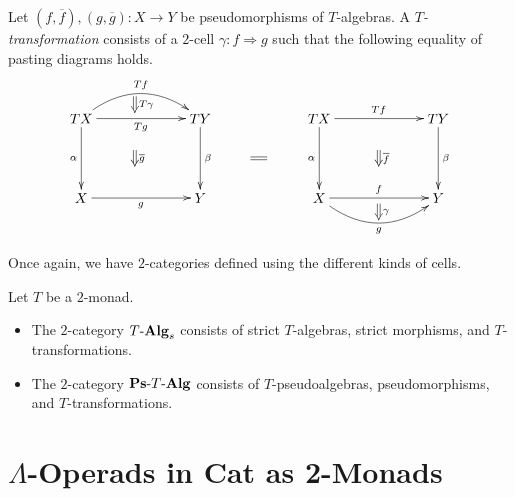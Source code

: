 \begin{Defi}
Let $(f, \overline{f}), (g, \overline{g}) \colon X \rightarrow Y$ be pseudomorphisms of $T$-algebras. A \textit{$T$-transformation} consists of a $2$-cell $\gamma \colon f \Rightarrow g$ such that the following equality of pasting diagrams holds.
    \[
        \xy
            (0,0)*+{TX}="00";
            (30,0)*+{TY}="10";
            (0,-20)*+{X}="01";
            (30,-20)*+{Y}="11";
            {\ar@/^1.5pc/^{Tf} "00" ; "10"};
            {\ar_{Tg} "00" ; "10"};
            {\ar^{\beta} "10" ; "11"};
            {\ar_{\alpha} "00" ; "01"};
            {\ar_{g} "01" ; "11"};
            {\ar@{=>}^{T \gamma} (13.5,5.5) ; (13.5,1.5)};
            {\ar@{=>}^{\overline{g}} (13.5,-8) ; (13.5,-12)};
            (60,0)*+{TX}="x00";
            (90,0)*+{TY}="x10";
            (60,-20)*+{X}="x01";
            (90,-20)*+{Y}="x11";
            {\ar^{Tf} "x00" ; "x10"};
            {\ar^{\beta} "x10" ; "x11"};
            {\ar_{\alpha} "x00" ; "x01"};
            {\ar^{f} "x01" ; "x11"};
            {\ar@/_1.5pc/_{g} "x01" ; "x11"};
            {\ar@{=>}^{\gamma} (75,-21.5) ; (75,-25.5)};
            {\ar@{=>}^{\overline{f}} (75,-8) ; (75,-12)};
            {\ar@{=} (42.75,-10) ; (46.75,-10)};
        \endxy
    \]

\end{Defi}

Once again, we have $2$-categories defined using the different kinds of cells.

\begin{Defi}
Let $T$ be a $2$-monad.
\begin{itemize}
\item The $2$-category $T\mbox{-}\mathbf{Alg}_{s}$ consists of strict $T$-algebras, strict morphisms, and $T$-transformations.
\item The $2$-category $\mathbf{Ps}\mbox{-}T\mbox{-}\mathbf{Alg}$ consists of $T$-pseudoalgebras, pseudomorphisms, and $T$-transformations.
\end{itemize}
\end{Defi}

\section{\texorpdfstring{$\Lambda$}{L}-Operads in Cat as 2-Monads}

